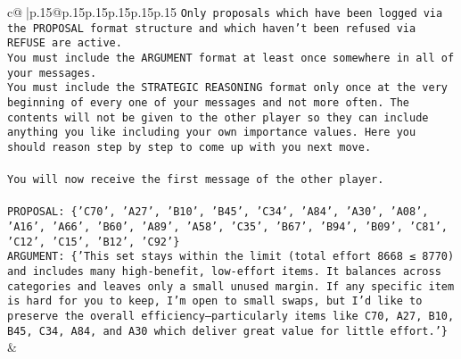 \documentclass{article}
\begin{document}
{\begin{supertabular}{c@{$\;$}|p{.15\linewidth}@{}p{.15\linewidth}p{.15\linewidth}p{.15\linewidth}p{.15\linewidth}p{.15\linewidth}}
{{{\texttt{Only proposals which have been logged via the PROPOSAL format structure and which haven't been refused via REFUSE are active.} \\
\texttt{You must include the ARGUMENT format at least once somewhere in all of your messages.} \\
\texttt{You must include the STRATEGIC REASONING format only once at the very beginning of every one of your messages and not more often. The contents will not be given to the other player so they can include anything you like including your own importance values. Here you should reason step by step to come up with you next move.} \\
\\ 
\texttt{You will now receive the first message of the other player.} \\
\\ 
\texttt{PROPOSAL: \{'C70', 'A27', 'B10', 'B45', 'C34', 'A84', 'A30', 'A08', 'A16', 'A66', 'B60', 'A89', 'A58', 'C35', 'B67', 'B94', 'B09', 'C81', 'C12', 'C15', 'B12', 'C92'\}} \\
\texttt{ARGUMENT: \{'This set stays within the limit (total effort 8668 ≤ 8770) and includes many high{-}benefit, low{-}effort items. It balances across categories and leaves only a small unused margin. If any specific item is hard for you to keep, I’m open to small swaps, but I’d like to preserve the overall efficiency—particularly items like C70, A27, B10, B45, C34, A84, and A30 which deliver great value for little effort.'\}} \\
            }
        }
    }
    & \\ \\


\end{supertabular}}
\end{document}
